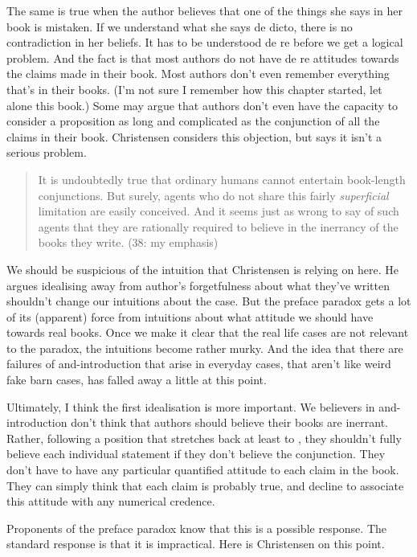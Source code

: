 \documentclass[11pt,]{book}
\begin{document}
The same is true when the author believes that one of the things she says in her book is mistaken. If we understand what she says de dicto, there is no contradiction in her beliefs. It has to be understood de re before we get a logical problem. And the fact is that most authors do not have de re attitudes towards the claims made in their book. Most authors don't even remember everything that's in their books. (I'm not sure I remember how this chapter started, let alone this book.) Some may argue that authors don't even have the capacity to consider a proposition as long and complicated as the conjunction of all the claims in their book. Christensen considers this objection, but says it isn't a serious problem.

\begin{quote}
It is undoubtedly true that ordinary humans cannot entertain book-length conjunctions. But surely, agents who do not share this fairly \emph{superficial} limitation are easily conceived. And it seems just as wrong to say of such agents that they are rationally required to believe in the inerrancy of the books they write. (38: my emphasis)
\end{quote}

We should be suspicious of the intuition that Christensen is relying on here. He argues idealising away from author's forgetfulness about what they've written shouldn't change our intuitions about the case. But the preface paradox gets a lot of its (apparent) force from intuitions about what attitude we should have towards real books. Once we make it clear that the real life cases are not relevant to the paradox, the intuitions become rather murky. And the idea that there are failures of and-introduction that arise in everyday cases, that aren't like weird fake barn cases, has falled away a little at this point.

Ultimately, I think the first idealisation is more important. We believers in and-introduction don't think that authors should believe their books are inerrant. Rather, following a position that stretches back at least to \citet{Stalnaker1984}, they shouldn't fully believe each individual statement if they don't believe the conjunction. They don't have to have any particular quantified attitude to each claim in the book. They can simply think that each claim is probably true, and decline to associate this attitude with any numerical credence.

Proponents of the preface paradox know that this is a possible response. The standard response is that it is impractical. Here is Christensen on this point.
\end{document}
